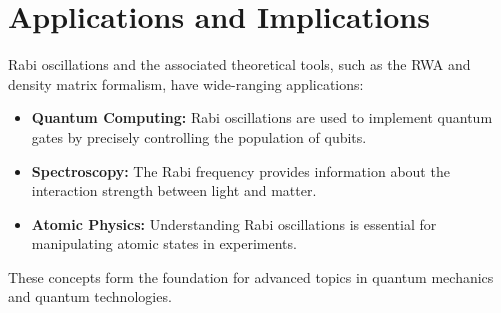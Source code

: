 
\section{Applications and Implications}

Rabi oscillations and the associated theoretical tools, such as the RWA and density matrix formalism, have wide-ranging applications:
\begin{itemize}
    \item \textbf{Quantum Computing:} Rabi oscillations are used to implement quantum gates by precisely controlling the population of qubits.
    \item \textbf{Spectroscopy:} The Rabi frequency provides information about the interaction strength between light and matter.
    \item \textbf{Atomic Physics:} Understanding Rabi oscillations is essential for manipulating atomic states in experiments.
\end{itemize}

These concepts form the foundation for advanced topics in quantum mechanics and quantum technologies.